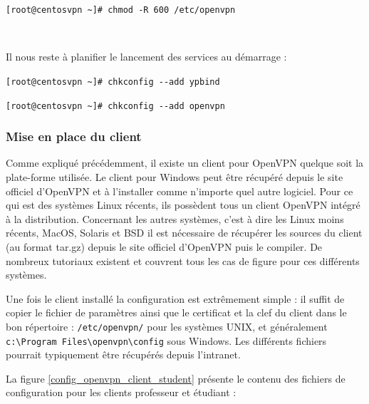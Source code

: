 \verb|[root@centosvpn ~]# chmod -R 600 /etc/openvpn|

~

Il nous reste à planifier le lancement des services au démarrage :

\verb|[root@centosvpn ~]# chkconfig --add ypbind|

\verb|[root@centosvpn ~]# chkconfig --add openvpn|

\subsubsection{Mise en place du client}

Comme expliqué précédemment, il existe un client pour OpenVPN quelque soit la plate-forme utilisée. Le client pour Windows peut être récupéré depuis le site officiel d'OpenVPN et à l'installer comme n'importe quel autre logiciel. Pour ce qui est des systèmes Linux récents, ils possèdent tous un client OpenVPN intégré à la distribution. Concernant les autres systèmes, c'est à dire les Linux moins récents, MacOS, Solaris et BSD il est nécessaire de récupérer les sources du client (au format tar.gz) depuis le site officiel d'OpenVPN puis le compiler. De nombreux tutoriaux existent et couvrent tous les cas de figure pour ces différents systèmes.

Une fois le client installé la configuration est extrêmement simple : il suffit de copier le fichier de paramètres ainsi que le certificat et la clef du client dans le bon répertoire : \verb|/etc/openvpn/| pour les systèmes UNIX, et généralement \verb|c:\Program Files\openvpn\config| sous Windows. Les différents fichiers pourrait typiquement être récupérés depuis l'intranet.

La figure \ref{config_openvpn_client_student} présente le contenu des fichiers de configuration pour les clients professeur et étudiant :

